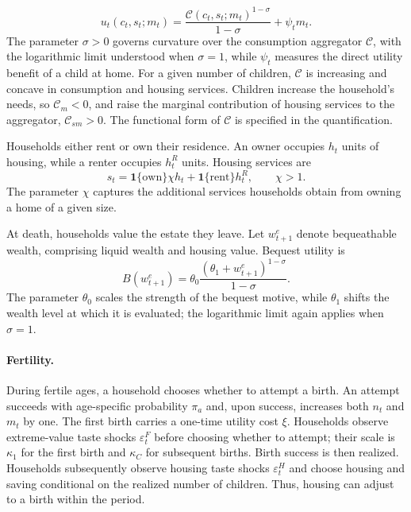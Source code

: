 \begin{equation*}
	u_t(c_t,s_t;m_t)
	=\frac{\mathcal C(c_t,s_t;m_t)^{1-\sigma}}{1-\sigma}
	+\psi_t m_t.
\end{equation*}
The parameter $\sigma>0$ governs curvature over the consumption aggregator
$\mathcal C$, with the logarithmic limit understood when $\sigma=1$, while
$\psi_t$ measures the direct utility benefit of a child at home.
For a given number of children, $\mathcal C$ is increasing and concave in
consumption and housing services. Children increase the household's needs,
so $\mathcal C_m<0$, and raise the marginal contribution of housing services
to the aggregator, $\mathcal C_{sm}>0$. The functional form of
$\mathcal C$ is specified in the quantification.

Households either rent or own their residence. An owner occupies $h_t$ units
of housing, while a renter occupies $h_t^R$ units. Housing services are
\begin{equation}
 s_t=\mathbf{1}\{\text{own}\}\chi h_t
     +\mathbf{1}\{\text{rent}\}h_t^R,
 \qquad \chi>1.
 \label{eq:env-housing-services}
\end{equation}
The parameter $\chi$ captures the additional services households obtain from
owning a home of a given size.

At death, households value the estate they leave. Let $w^e_{t+1}$ denote
bequeathable wealth, comprising liquid wealth and housing value. Bequest
utility is
\begin{equation}
 B(w^e_{t+1})
 =\theta_0\frac{(\theta_1+w^e_{t+1})^{1-\sigma}}{1-\sigma}.
 \label{eq:env-bequest-utility}
\end{equation}
The parameter $\theta_0$ scales the strength of the bequest motive, while
$\theta_1$ shifts the wealth level at which it is evaluated; the logarithmic
limit again applies when $\sigma=1$.

\paragraph{Fertility.}
During fertile ages, a household chooses whether to attempt a birth. An
attempt succeeds with age-specific probability $\pi_a$ and, upon success,
increases both $n_t$ and $m_t$ by one. The first birth carries a one-time
utility cost $\xi$. Households observe extreme-value taste shocks
$\varepsilon_t^F$ before choosing whether to attempt; their scale is
$\kappa_1$ for the first birth and $\kappa_C$ for subsequent births.
Birth success is then realized. Households subsequently observe housing
taste shocks $\varepsilon_t^H$ and choose housing and saving conditional on
the realized number of children. Thus, housing can adjust to a birth within
the period.

